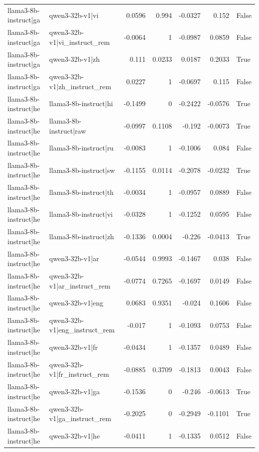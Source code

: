 \begin{table}
\begin{tabular}{l l r r r r l}
llama3-8b-instruct|ga & qwen3-32b-v1|vi & 0.0596 & 0.994 & -0.0327 & 0.152 & False \\
llama3-8b-instruct|ga & qwen3-32b-v1|vi_instruct_rem & -0.0064 & 1 & -0.0987 & 0.0859 & False \\
llama3-8b-instruct|ga & qwen3-32b-v1|zh & 0.111 & 0.0233 & 0.0187 & 0.2033 & True \\
llama3-8b-instruct|ga & qwen3-32b-v1|zh_instruct_rem & 0.0227 & 1 & -0.0697 & 0.115 & False \\
llama3-8b-instruct|he & llama3-8b-instruct|hi & -0.1499 & 0 & -0.2422 & -0.0576 & True \\
llama3-8b-instruct|he & llama3-8b-instruct|raw & -0.0997 & 0.1108 & -0.192 & -0.0073 & True \\
llama3-8b-instruct|he & llama3-8b-instruct|ru & -0.0083 & 1 & -0.1006 & 0.084 & False \\
llama3-8b-instruct|he & llama3-8b-instruct|sw & -0.1155 & 0.0114 & -0.2078 & -0.0232 & True \\
llama3-8b-instruct|he & llama3-8b-instruct|th & -0.0034 & 1 & -0.0957 & 0.0889 & False \\
llama3-8b-instruct|he & llama3-8b-instruct|vi & -0.0328 & 1 & -0.1252 & 0.0595 & False \\
llama3-8b-instruct|he & llama3-8b-instruct|zh & -0.1336 & 0.0004 & -0.226 & -0.0413 & True \\
llama3-8b-instruct|he & qwen3-32b-v1|ar & -0.0544 & 0.9993 & -0.1467 & 0.038 & False \\
llama3-8b-instruct|he & qwen3-32b-v1|ar_instruct_rem & -0.0774 & 0.7265 & -0.1697 & 0.0149 & False \\
llama3-8b-instruct|he & qwen3-32b-v1|eng & 0.0683 & 0.9351 & -0.024 & 0.1606 & False \\
llama3-8b-instruct|he & qwen3-32b-v1|eng_instruct_rem & -0.017 & 1 & -0.1093 & 0.0753 & False \\
llama3-8b-instruct|he & qwen3-32b-v1|fr & -0.0434 & 1 & -0.1357 & 0.0489 & False \\
llama3-8b-instruct|he & qwen3-32b-v1|fr_instruct_rem & -0.0885 & 0.3709 & -0.1813 & 0.0043 & False \\
llama3-8b-instruct|he & qwen3-32b-v1|ga & -0.1536 & 0 & -0.246 & -0.0613 & True \\
llama3-8b-instruct|he & qwen3-32b-v1|ga_instruct_rem & -0.2025 & 0 & -0.2949 & -0.1101 & True \\
llama3-8b-instruct|he & qwen3-32b-v1|he & -0.0411 & 1 & -0.1335 & 0.0512 & False \\

\end{tabular}
\end{table}
